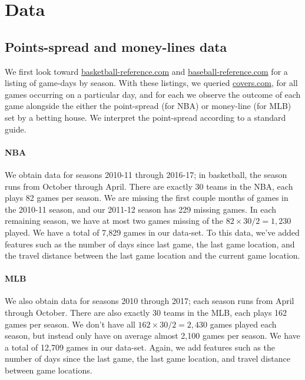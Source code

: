 \documentclass[letterpaper,12pt]{article}
\begin{document}
\section{Data}
\subsection{Points-spread and money-lines data} We first look toward 
\href{http://www.basketball-reference.com/leagues/}{basketball-reference.com} and
\href{http://www.baseball-reference.com/leagues/}{baseball-reference.com}
for a listing of game-days by season. With these listings, we queried \href{http://www.covers.com/sports/NBA/matchups?selectedDate=2011-1-01}{covers.com},
for all games occurring on a particular day, and for each we observe the
outcome of each game alongside the either the point-spread (for NBA) or money-line (for MLB) 
set by a betting house. 
We interpret the point-spread according to a standard guide.\citep{hrisports} 

\paragraph{NBA}
We obtain
data for seasons 2010-11 through 2016-17; in basketball, the season runs from October through April. 
There are exactly 30 teams in the NBA,
each plays 82 games per season.
We are missing the first couple months of games 
in the 2010-11 season, and our 2011-12 season has 229 missing games. In each remaining
season, we have at most two games missing of the $82 \times 30 / 2 = 1,230$ played.
We have a total of 7,829 games in our data-set.
To this data, we've added features such as 
the number of days since last game, the last game location, and the travel 
distance between the last game location and the current game location.

\paragraph{MLB} We also obtain data for seasons 2010 through 2017; each season runs from 
April through October. There are also exactly 30 teams in the MLB, each plays 162 games per season.
We don't have all $162 \times 30 / 2 = 2,430$ games played each season, but instead only have
on average almost 2,100 games per season. We have a total of 12,709 games in our data-set. Again,
we add features such as the number of days since the last game, the last game location, and travel
distance between game locations.
\end{document}
